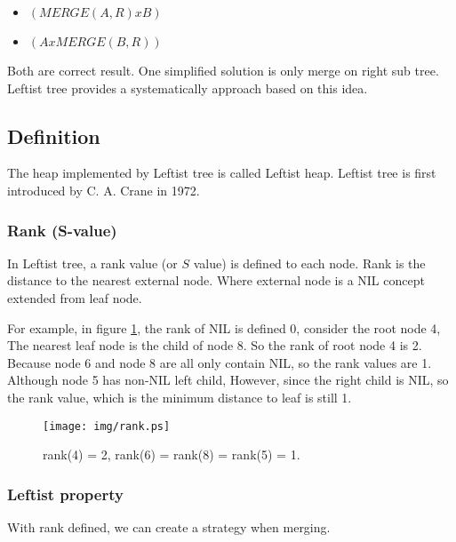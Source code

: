 \documentclass{article}
\begin{document}
\begin{itemize}
\item $(MERGE(A, R) x B)$
\item $(A x MERGE(B, R))$
\end{itemize}

Both are correct result. One simplified solution is only merge on right
sub tree. Leftist tree provides a systematically approach based on this
idea.

\subsection{Definition}

The heap implemented by Leftist tree is called Leftist heap. Leftist
tree is first introduced by C. A. Crane in 1972\cite{wiki-leftist-tree}.

\subsubsection{Rank (S-value)}

In Leftist tree, a rank value (or $S$ value) is defined to each node.
Rank is the distance to the nearest external node. Where external node
is a NIL concept extended from leaf node.

For example, in figure \ref{fig:rank}, the rank of NIL
is defined 0, consider the root node 4, The nearest leaf node is
the child of node 8. So the rank of root node 4 is 2. Because node
6 and node 8 are all only contain NIL, so the rank values are 1.
Although node 5 has non-NIL left child, However, since the right
child is NIL, so the rank value, which is the minimum distance
to leaf is still 1.

\begin{figure}[htbp]
   \begin{center}
     \texttt{[image: img/rank.ps]}
     \caption{rank(4) = 2, rank(6) = rank(8) = rank(5) = 1.} \label{fig:rank}
   \end{center}
\end{figure}

\subsubsection{Leftist property}

With rank defined, we can create a strategy when merging.
\end{document}
